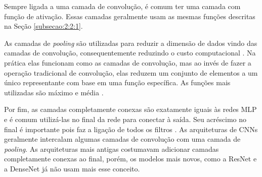 Sempre ligada a uma camada de convolução, é comum ter uma camada com função de ativação. Essas camadas geralmente usam as mesmas funções descritas na Seção \ref{subsecao:2:2:1}.

As camadas de \textit{pooling} são utilizadas para reduzir a dimensão de dados vindo das camadas de convolução, consequentemente reduzindo o custo computacional \cite{ferreira-2017}. Na prática elas funcionam como as camadas de convolução, mas ao invés de fazer a operação tradicional de convolução, elas reduzem um conjunto de elementos a um único representante com base em uma função específica. As funções mais utilizadas são máximo e média \cite{ferreira-2017}.

Por fim, as camadas completamente conexas são exatamente iguais às redes MLP e é comum utilizá-las no final da rede para conectar à saída. Seu acréscimo no final é importante pois faz a ligação de todos os filtros \cite{ferreira-2017}. As arquiteturas de \ac{CNN}s geralmente intercalam algumas camadas de convolução com uma camada de \textit{pooling}. As arquiteturas mais antigas costumavam adicionar camadas completamente conexas ao final, porém, os modelos mais novos, como a \ac{ResNet} e a \ac{DenseNet} já não usam mais esse conceito.








